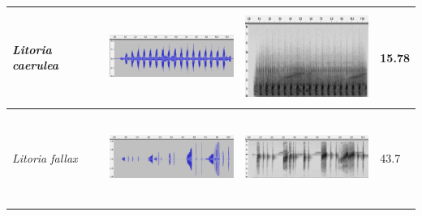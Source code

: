 \begin{table}[htb!]
\begin{tabular}{llll}
\textit{Litoria caerulea}    &  \begin{minipage}{.3\textwidth} \includegraphics[width=45mm, height=30mm]{image/Ch1/caerulea_wav.png}  \end{minipage}      &     \begin{minipage}{.3\textwidth} \includegraphics[width=45mm, height=30mm]{image/Ch1/caerulea_spec.png}   \end{minipage}     & 15.78 \\ \hline
\textit{Litoria fallax}      &      \begin{minipage}{.3\textwidth} \includegraphics[width=45mm, height=30mm]{image/Ch1/fallax_wav.png} \end{minipage}   &   \begin{minipage}{.3\textwidth} \includegraphics[width=45mm, height=30mm]{image/Ch1/fallax_spec.png}   \end{minipage}       & 43.7  \\ \hline
\end{tabular}
\end{table}




